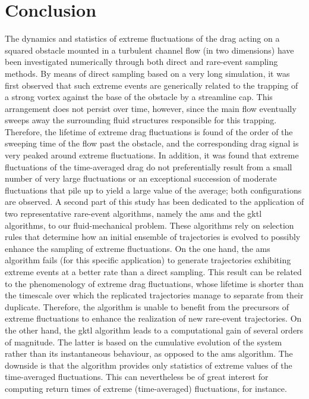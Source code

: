 \section{Conclusion}
\label{conlusion}
The dynamics and statistics of extreme fluctuations of the drag acting on a squared obstacle mounted in a turbulent channel flow (in two dimensions) have been investigated numerically through both direct and rare-event sampling methods. 
By means of direct sampling based on a very long simulation, it was first observed that such extreme events are generically related to the trapping of a strong vortex against the base of the obstacle by a streamline cap.
This arrangement does not persist over time, however, since the main flow eventually sweeps away the surrounding fluid structures responsible for this trapping. Therefore, the lifetime of extreme drag fluctuations is found of the order of the sweeping time of the flow past the obstacle, and the corresponding drag signal is very peaked around extreme fluctuations.
In addition, it was found that extreme fluctuations of the time-averaged drag do not preferentially result from a small number of very large fluctuations or an exceptional succession of moderate fluctuations that pile up to yield a large value of the average; both configurations are observed. 
A second part of this study has been dedicated to the application of two representative rare-event algorithms, namely the \acl{ams} and the \acl{gktl} algorithms, to our fluid-mechanical problem. These algorithms rely on selection rules that determine how an initial ensemble of trajectories is evolved to possibly enhance the sampling of extreme fluctuations. 
%
On the one hand, the \ac{ams} algorithm fails (for this specific application) to generate trajectories exhibiting extreme events at a better rate than a direct sampling. This result can be related to the phenomenology of extreme drag fluctuations, whose lifetime is shorter than the timescale over which the replicated trajectories manage to separate from their duplicate.
Therefore, the algorithm is unable to benefit from the precursors of extreme fluctuations to enhance the realization of new rare-event trajectories. 
%
On the other hand, the \ac{gktl} algorithm leads to a computational gain of several orders of magnitude. The latter is based on the cumulative evolution of the system rather than its instantaneous behaviour, as opposed to the \ac{ams} algorithm. The downside is that the algorithm provides only statistics of extreme values of the time-averaged fluctuations. This can nevertheless be of great interest for computing return times of extreme (time-averaged) fluctuations, for instance.   

